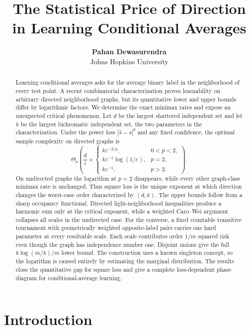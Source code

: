 \documentclass{article}
\title{The Statistical Price of Direction in Learning Conditional Averages}
\author{\textbf{Pahan Dewasurendra} \\ Johns Hopkins University}
\theoremstyle{definition}
\theoremstyle{remark}
\begin{document}
\maketitle

\begin{abstract}
Learning conditional averages asks for the average binary label in the neighborhood of every test point. A recent combinatorial characterization proves learnability on arbitrary directed neighborhood graphs, but its quantitative lower and upper bounds differ by logarithmic factors. We determine the exact minimax rates and expose an unexpected critical phenomenon. Let $d$ be the largest shattered independent set and let $k$ be the largest bichromatic independent set, the two parameters in the characterization. Under the power loss $|\widehat s-s|^p$ and any fixed confidence, the optimal sample complexity on directed graphs is \[ \Theta_p\!\left(\frac d\varepsilon+
\begin{cases}
k\varepsilon^{-2/p},&0<p<2,\\
k\varepsilon^{-1}\log(1/\varepsilon),&p=2,\\
k\varepsilon^{-1},&p>2.
\end{cases}\right).
\] On undirected graphs the logarithm at $p=2$ disappears, while every other graph-class minimax rate is unchanged. Thus square loss is the unique exponent at which direction changes the worst-case order characterized by $(d,k)$. The upper bounds follow from a sharp occupancy functional. Directed light-neighborhood inequalities produce a harmonic sum only at the critical exponent, while a weighted Caro--Wei argument collapses all scales in the undirected case. For the converse, a fixed countable transitive tournament with geometrically weighted opposite-label pairs carries one hard parameter at every resolvable scale. Each scale contributes order $1/m$ squared risk even though the graph has independence number one. Disjoint unions give the full $k\log(m/k)/m$ lower bound. The construction uses a known singleton concept, so the logarithm is caused entirely by estimating the marginal distribution. The results close the quantitative gap for square loss and give a complete loss-dependent phase diagram for conditional-average learning.
\end{abstract}

\section{Introduction}
\end{document}

